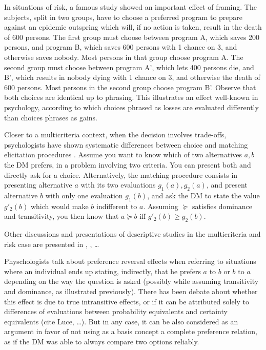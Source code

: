 \documentclass[french, english]{llncs}
\begin{document}
In situations of risk, a famous study \citep{tversky_1981} showed an important effect of framing. The subjects, split in two groups, have to choose a preferred program to prepare against an epidemic outspring which will, if no action is taken, result in the death of 600 persons. The first group must choose between program A, which saves 200 persons, and program B, which saves 600 persons with 1 chance on 3, and otherwise saves nobody. Most persons in that group choose program A. The second group must choose between program A', which lets 400 persons die, and B', which results in nobody dying with 1 chance on 3, and otherwise the death of 600 persons. Most persons in the second group choose program B'. Observe that both choices are identical up to phrasing. This illustrates an effect well-known in psychology, according to which choices phrased as losses are evaluated differently than choices phrases as gains.

Closer to a multicriteria context, when the decision involves trade-offs, psychologists have shown systematic differences between choice and matching elicitation procedures \citep{tversky_contingent_1988}. Assume you want to know which of two alternatives $a, b$ the \ac{DM} prefers, in a problem involving two criteria. You can present both and directly ask for a choice. Alternatively, the matching procedure consists in presenting alternative $a$ with its two evaluations $g_1(a), g_2(a)$, and present alternative $b$ with only one evaluation $g_1(b)$, and ask the \ac{DM} to state the value $g'_2(b)$ which would make $b$ indifferent to $a$. Assuming $\succeq$ satisfies dominance and transitivity, you then know that $a \succeq b$ iff $g'_2(b) ≥ g_2(b)$.

Other discussions and presentations of descriptive studies in the multicriteria and risk case are presented in \citet[Ch. 2]{deparis_2012}, \citet{slovic_construction_2006}, …

Physchologists talk about preference reversal effects when referring to situations where an individual ends up stating, indirectly, that he prefers $a$ to $b$ or $b$ to $a$ depending on the way the question is asked (possibly while assuming transitivity and dominance, as illustrated previously). There has been debate about whether this effect is due to true intransitive effects, or if it can be attributed solely to differences of evaluations between probability equivalents and certainty equivalents (cite Luce, …). But in any case, it can be also considered as an argument in favor of not using as a basis concept a complete preference relation, as if the \ac{DM} was able to always compare two options reliably.
\end{document}
